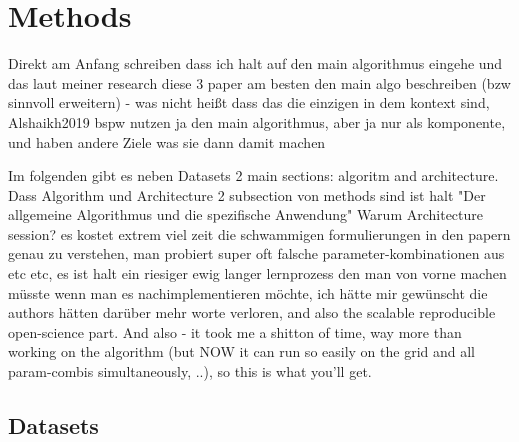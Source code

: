 \documentclass[11pt,
  paper=a4, 
  hidelinks,
  bibliography=totocnumbered,
	captions=tableheading,
	BCOR=10mm
]{scrreprt}
\theoremstyle{definition}
\begin{document}
\chapter{Methods}

Direkt am Anfang schreiben dass ich halt auf den main algorithmus eingehe und das laut meiner research diese 3 paper am besten den main algo beschreiben (bzw sinnvoll erweitern) - was nicht heißt dass das die einzigen in dem kontext sind, Alshaikh2019 bspw nutzen ja den main algorithmus, aber ja nur als komponente, und haben andere Ziele was sie dann damit machen

Im folgenden gibt es neben Datasets 2 main sections: algoritm and architecture. Dass Algorithm und Architecture 2 subsection von methods sind ist halt "Der allgemeine Algorithmus und die spezifische Anwendung" Warum Architecture session? es kostet extrem viel zeit die schwammigen formulierungen in den papern genau zu verstehen, man probiert super oft falsche parameter-kombinationen aus etc etc, es ist halt ein riesiger ewig langer lernprozess den man von vorne machen müsste wenn man es nachimplementieren möchte, ich hätte mir gewünscht die authors hätten darüber mehr worte verloren, and also the scalable reproducible open-science part. And also - it took me a shitton of time, way more than working on the algorithm (but NOW it can run so easily on the grid and all param-combis simultaneously, ..), so this is what you'll get.


\section{Datasets}

\end{document}

